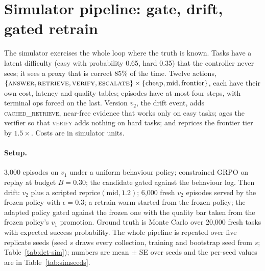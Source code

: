 \documentclass[10pt]{article}
\begin{document}
\section{Simulator pipeline: gate, drift, gated retrain}
\label{sec:sim}

The simulator exercises the whole loop where the truth is known. Tasks have a latent difficulty (easy with probability 0.65, hard 0.35) that the controller never sees; it sees a proxy that is correct 85\% of the time. Twelve actions, $\{\textsc{answer},\textsc{retrieve},\textsc{verify},\textsc{escalate}\}\times\{\text{cheap},\text{mid},\text{frontier}\}$, each have their own cost, latency and quality tables; episodes have at most four steps, with terminal ops forced on the last. Version $v_2$, the drift event, adds \textsc{cached\_retrieve}, near-free evidence that works only on easy tasks; ages the verifier so that \textsc{verify} adds nothing on hard tasks; and reprices the frontier tier by $1.5\times$. Costs are in simulator units.

\paragraph{Setup.} 3{,}000 episodes on $v_1$ under a uniform behaviour policy; constrained GRPO on replay at budget $B=0.30$; the candidate gated against the behaviour log. Then drift: $v_2$ plus a scripted $\mathrm{reprice}(\text{mid},1.2)$; 6{,}000 fresh $v_2$ episodes served by the frozen policy with $\epsilon=0.3$; a retrain warm-started from the frozen policy; the adapted policy gated against the frozen one with the quality bar taken from the frozen policy's $v_1$ promotion. Ground truth is Monte Carlo over 20{,}000 fresh tasks with expected success probability. The whole pipeline is repeated over five replicate seeds (seed $s$ draws every collection, training and bootstrap seed from $s$; Table~\ref{tab:det-sim}); numbers are mean $\pm$ SE over seeds and the per-seed values are in Table~\ref{tab:simseeds}.
\end{document}
